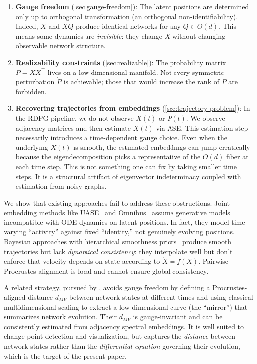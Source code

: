 \documentclass{article}
\theoremstyle{plain}
\theoremstyle{definition}
\theoremstyle{remark}
\begin{document}
\begin{enumerate}
\item \textbf{Gauge freedom} (\cref{sec:gauge-freedom}): The latent positions are determined only up to orthogonal transformation (an orthogonal non-identifiability). Indeed, $X$ and $XQ$ produce identical networks for any $Q \in O(d)$. This means some dynamics are \emph{invisible}: they change $X$ without changing observable network structure.

\item \textbf{Realizability constraints} (\cref{sec:realizable}): The probability matrix $P = XX^\top$ lives on a low-dimensional manifold. Not every symmetric perturbation $\dot{P}$ is achievable; those that would increase the rank of $P$ are forbidden.

\item \textbf{Recovering trajectories from embeddings} (\cref{sec:trajectory-problem}): In the RDPG pipeline, we do not observe $X(t)$ or $P(t)$. We observe adjacency matrices and then estimate $X(t)$ via ASE. This estimation step necessarily introduces a time-dependent gauge choice. Even when the underlying $X(t)$ is smooth, the estimated embeddings can jump erratically because the eigendecomposition picks a representative of the $O(d)$ fiber at each time step. This is not something one can fix by taking smaller time steps. It is a structural artifact of eigenvector indeterminacy coupled with estimation from noisy graphs.
\end{enumerate}

We show that existing approaches fail to address these obstructions.
Joint embedding methods like UASE~\citep{gallagher2021spectral} and Omnibus~\citep{levin2017central} assume generative models incompatible with ODE dynamics on latent positions. In fact, they model time-varying ``activity'' against fixed ``identity,'' not genuinely evolving positions.
Bayesian approaches with hierarchical smoothness priors~\citep{loyal2025} produce smooth trajectories but lack \emph{dynamical consistency}: they interpolate well but don't enforce that velocity depends on state according to $\dot{X} = f(X)$.
Pairwise Procrustes alignment is local and cannot ensure global consistency.

A related strategy, pursued by \citet{athreya2024euclidean}, avoids gauge freedom by defining a Procrustes-aligned distance $d_{MV}$ between network states at different times and using classical multidimensional scaling to extract a low-dimensional curve (the ``mirror'') that summarizes network evolution.
Their $d_{MV}$ is gauge-invariant and can be consistently estimated from adjacency spectral embeddings. It is well suited to change-point detection and visualization, but captures the \emph{distance} between network states rather than the \emph{differential equation} governing their evolution, which is the target of the present paper.
\end{document}
